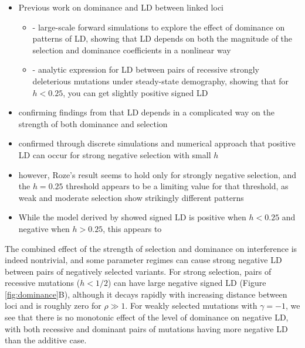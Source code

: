 \documentclass[]{article}
\begin{document}
\begin{itemize}
    \item Previous work on dominance and LD between linked loci
        \begin{itemize}
            \item \citep{Garcia2021-zn} - large-scale forward simulations to explore the
                effect of dominance on patterns of LD, showing that LD depends on both 
                the magnitude of the selection and dominance coefficients in a nonlinear way
            \item \citep{Roze2021-cf} -
                analytic expression for LD between pairs of recessive
                strongly deleterious mutations under steady-state demography, showing that
                for $h<0.25$, you can get slightly positive signed LD
        \end{itemize}
    \item confirming findings from \citet{Garcia2021-zn} that LD depends in a
        complicated way on the strength of both dominance and selection
    \item confirmed through discrete simulations and numerical approach that positive LD
        can occur for strong negative selection with small $h$
    \item however, Roze's result seems to hold only for strongly negative selection,
        and the $h=0.25$ threshold appears to be a limiting value for that threshold,
        as weak and moderate selection show strikingly different patterns
    \item While the model derived by \citeauthor{Roze2021-cf} showed signed LD is
        positive when $h<0.25$ and negative when $h>0.25$, this appears to 
\end{itemize}

The combined effect of the strength of selection and dominance on interference
is indeed nontrivial, and some parameter regimes can cause strong negative LD
between pairs of negatively selected variants. For strong selection, pairs of
recessive mutations (\(h<1/2\)) can have large negative signed LD (Figure
\ref{fig:dominance}B), although it decays rapidly with increasing distance between
loci and is roughly zero for \(\rho \gg 1\). For weakly selected mutations with
\(\gamma=-1\), we see that there is no monotonic effect of the level of dominance
on negative LD, with both recessive and dominant pairs of mutations having more
negative LD than the additive case.
\end{document}
